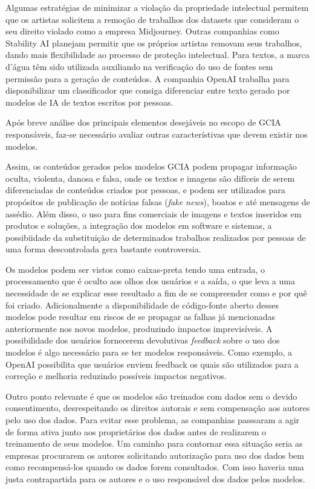 Algumas estratégias de minimizar a violação da propriedade intelectual permitem que os artistas solicitem a remoção 
de trabalhos dos datasets que consideram o seu direito violado como a empresa Midjourney. 
Outras companhias como Stability AI planejam permitir que os próprios artistas removam seus trabalhos, 
dando mais flexibilidade ao processo de proteção intelectual. 
Para textos, a marca d'água têm sido utilizada auxiliando na verificação do uso de fontes sem permissão para a geração 
de conteúdos. A companhia OpenAI trabalha para disponibilizar um classificador que consiga diferenciar entre 
texto gerado por modelos de IA de textos escritos por pessoas.


Após breve análise dos principais elementos desejáveis no escopo de GCIA responsáveis, faz-se necessário avaliar  
outras característivas que devem existir nos modelos.

Assim, os conteúdos gerados pelos modelos GCIA podem propagar informação oculta, violenta, danosa e falsa, onde os textos e 
imagens são difíceis de serem diferenciadas de conteúdos criados por pessoas, e podem ser utilizados para propósitos 
de publicação de notícias falsas (\textit{fake news}), boatos e até mensagens de assédio. 
Além disso, o uso para fins comerciais de imagens e textos inseridos 
em produtos e soluções, a integração dos modelos em software e sistemas, a possibiidade da substituição 
de determinados trabalhos realizados por pessoas de uma forma descontrolada gera bastante controversia.

Os modelos podem ser vistos como caixas-preta tendo uma entrada, o processamento que é oculto aos olhos dos usuários 
e a saída, o que leva a uma necessidade de se explicar esse resultado a fim de se compreender como e por quê foi criado.
Adicionalmente a disponibilidade de código-fonte aberto desses modelos pode resultar em riscos de se propagar as falhas 
já mencionadas anteriormente nos novos modelos, produzindo impactos imprevisíveis. 
A possibilidade dos usuários fornecerem devolutivas \textit{feedback} sobre o uso dos modelos é algo necessário
para se ter modelos responsáveis. Como exemplo, a OpenAI possibilita que usuários enviem feedback
os quais são utilizados para a correção e melhoria reduzindo possíveis impactos negativos.

Outro ponto relevante é que os modelos são treinados com dados sem o devido consentimento, desrespeitando os direitos
autorais e sem compensação aos autores pelo uso dos dados. Para evitar esse problema, as companhias passsaram 
a agir de forma ativa junto aos proprietários dos dados antes de realizarem o treinamento de seus modelos. 
Um caminho para contornar essa situação seria as empresas procurarem os autores solicitando autorização 
para uso dos dados bem como recompensá-los quando os dados forem consultados. Com isso haveria uma justa contrapartida 
para os autores e o uso responsável dos dados pelos modelos.

